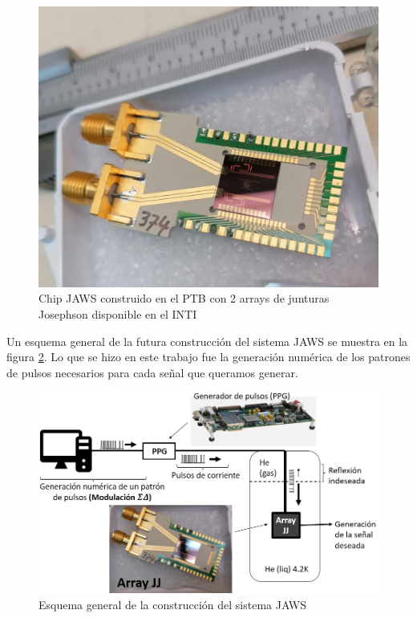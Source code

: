 \documentclass[twoside]{article}
\begin{document}
\begin{multicols}{2}
\begin{figure}[H]
\centering
\includegraphics[width=0.75\linewidth]{figuras/jaws.jpg}
\caption{Chip JAWS construido en el PTB con 2 arrays de junturas Josephson disponible en el INTI}
\label{fig:chipJaws}
\end{figure}

Un esquema general de la futura construcción del sistema JAWS se muestra en la figura \ref{fig:esquemaJaws}. Lo que se hizo en este trabajo fue la generación numérica de los patrones de pulsos necesarios para cada señal que queramos generar.

\begin{figure}[H]
\centering
\includegraphics[width=\linewidth]{figuras/esquema_contruccion.png}
\caption{Esquema general de la construcción del sistema JAWS}
\label{fig:esquemaJaws}
\end{figure}


\end{multicols}
\end{document}
